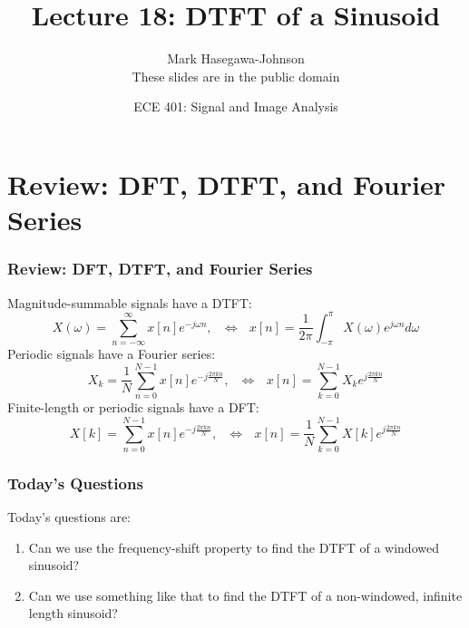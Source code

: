 \documentclass{beamer}
\title{Lecture 18: DTFT of a Sinusoid}
\author{Mark Hasegawa-Johnson\\These slides are in the public domain}
\date{ECE 401: Signal and Image Analysis}
\begin{document}
\begin{frame}
  \maketitle
\end{frame}

\begin{frame}
  \tableofcontents
\end{frame}

\section[Review]{Review: DFT, DTFT, and Fourier Series}
\setcounter{subsection}{1}

\begin{frame}
  \frametitle{Review: DFT, DTFT, and Fourier Series}

  Magnitude-summable signals have a DTFT:
  \begin{displaymath}
    X(\omega) = \sum_{n=-\infty}^\infty x[n]e^{-j\omega n},~~~\Leftrightarrow~~~
    x[n] = \frac{1}{2\pi}\int_{-\pi}^\pi X(\omega)e^{j\omega n}d\omega
  \end{displaymath}
  Periodic signals have a Fourier series:
  \begin{displaymath}
    X_k = \frac{1}{N}\sum_{n=0}^{N-1} x[n]e^{-j\frac{2\pi kn}{N}},~~~\Leftrightarrow~~~
    x[n] = \sum_{k=0}^{N-1} X_k e^{j\frac{2\pi kn}{N}}
  \end{displaymath}
  Finite-length or periodic signals have a DFT:
  \begin{displaymath}
    X[k] = \sum_{n=0}^{N-1} x[n]e^{-j\frac{2\pi kn}{N}},~~~\Leftrightarrow~~~
    x[n] = \frac{1}{N}\sum_{k=0}^{N-1} X[k] e^{j\frac{2\pi kn}{N}}
  \end{displaymath}
\end{frame}

\begin{frame}
  \frametitle{Today's Questions}

  Today's questions are:
  \begin{enumerate}
  \item Can we use the frequency-shift property to find the DTFT of a
    windowed sinusoid?
  \item Can we use something like that to find the DTFT of a
    non-windowed, infinite length sinusoid?
  \end{enumerate}
\end{frame}
\end{document}
